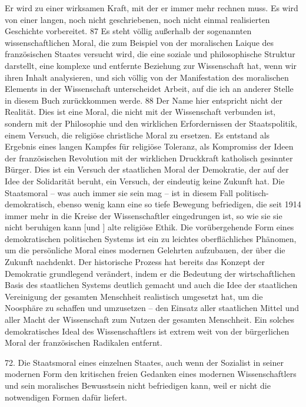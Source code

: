 \documentclass[11pt,a4paper]{book}
\begin{document}
Er wird zu einer wirksamen Kraft, mit der er immer mehr rechnen muss. Es wird von einer langen, noch nicht geschriebenen, noch nicht einmal realisierten Geschichte vorbereitet. 87 Es steht völlig außerhalb der sogenannten wissenschaftlichen Moral, die zum Beispiel von der moralischen Laique des französischen Staates versucht wird, die eine soziale und philosophische Struktur darstellt, eine komplexe und entfernte Beziehung zur Wissenschaft hat, wenn wir ihren Inhalt analysieren, und sich völlig von der Manifestation des moralischen Elements in der Wissenschaft unterscheidet Arbeit, auf die ich an anderer Stelle in diesem Buch zurückkommen werde. 88 Der Name hier entspricht nicht der Realität. Dies ist eine Moral, die nicht mit der Wissenschaft verbunden ist, sondern mit der Philosophie und den wirklichen Erfordernissen der Staatspolitik, einem Versuch, die religiöse christliche Moral zu ersetzen. Es entstand als Ergebnis eines langen Kampfes für religiöse Toleranz, als Kompromiss der Ideen der französischen Revolution mit der wirklichen Druckkraft katholisch gesinnter Bürger. Dies ist ein Versuch der staatlichen Moral der Demokratie, der auf der Idee der Solidarität beruht, ein Versuch, der eindeutig keine Zukunft hat. Die Staatsmoral -- was auch immer sie sein mag -- ist in diesem Fall politisch-demokratisch, ebenso wenig kann eine so tiefe Bewegung befriedigen, die seit 1914 immer mehr in die Kreise der Wissenschaftler eingedrungen ist, so wie sie sie nicht beruhigen kann [und ] alte religiöse Ethik. Die vorübergehende Form eines demokratischen politischen Systems ist ein zu leichtes oberflächliches Phänomen, um die persönliche Moral eines modernen Gelehrten aufzubauen, der über die Zukunft nachdenkt. Der historische Prozess hat bereits das Konzept der Demokratie grundlegend verändert, indem er die Bedeutung der wirtschaftlichen Basis des staatlichen Systems deutlich gemacht und auch die Idee der staatlichen Vereinigung der gesamten Menschheit realistisch umgesetzt hat, um die Noosphäre zu schaffen und umzusetzen -- den Einsatz aller staatlichen Mittel und aller Macht der Wissenschaft zum Nutzen der gesamten Menschheit. Ein solches demokratisches Ideal des Wissenschaftlers ist extrem weit von der bürgerlichen Moral der französischen Radikalen entfernt.



72. Die Staatsmoral eines einzelnen Staates, auch wenn der Sozialist in seiner modernen Form den kritischen freien Gedanken eines modernen Wissenschaftlers und sein moralisches Bewusstsein nicht befriedigen kann, weil er nicht die notwendigen Formen dafür liefert.
\end{document}
